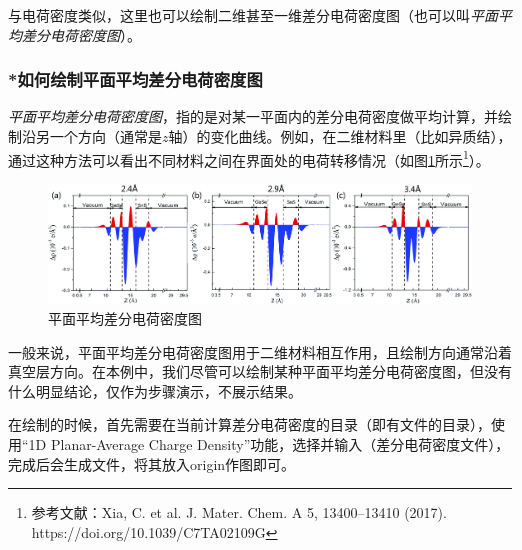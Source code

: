 与电荷密度类似，这里也可以绘制二维甚至一维差分电荷密度图（也可以叫\emph{平面平均差分电荷密度图}）。

\subsubsection{*如何绘制平面平均差分电荷密度图}

\emph{平面平均差分电荷密度图}，指的是对某一平面内的差分电荷密度做平均计算，并绘制沿另一个方向（通常是$z$轴）的变化曲线。例如，在二维材料里（比如异质结），通过这种方法可以看出不同材料之间在界面处的电荷转移情况（如图\ref{fig:电荷密度与差分电荷密度-平面平均差分电荷密度图}所示\footnote{参考文献：Xia, C. et al. J. Mater. Chem. A 5, 13400–13410 (2017). https://doi.org/10.1039/C7TA02109G}）。

\begin{figure}
    \centering
    \includegraphics[width=1\linewidth]{VASP计算/静态自洽与电荷密度/电荷密度与差分电荷密度/fig/平面平均差分电荷密度图.png}
    \caption{平面平均差分电荷密度图}
    \label{fig:电荷密度与差分电荷密度-平面平均差分电荷密度图}
\end{figure}

\begin{attention}
    一般来说，平面平均差分电荷密度图用于二维材料相互作用，且绘制方向通常沿着真空层方向。在本例中，我们尽管可以绘制某种平面平均差分电荷密度图，但没有什么明显结论，仅作为步骤演示，不展示结果。
\end{attention}

在绘制的时候，首先需要在当前计算差分电荷密度的目录（即有文件的目录），使用“1D Planar-Average Charge Density”功能，选择并输入（差分电荷密度文件），完成后会生成文件，将其放入origin作图即可。








